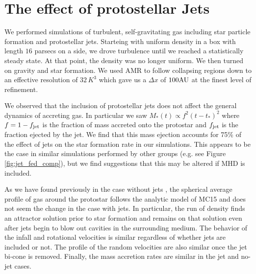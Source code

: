 \documentclass[../dissertation.tex]{subfiles}
\begin{document}

\section{The effect of protostellar Jets}
We performed simulations of turbulent, self-gravitating gas including star particle formation and protostellar jets. 
Starteing with uniform density in a box with length $16$ parsecs on a side, we drove turbulence until we reached a statistically steady state.
At that point, the density was no longer uniform.
We then turned on gravity and star formation.
We used AMR to follow collapsing regions down to an effective resolution of $32 \, K^3$ which gave us a $\Delta x$ of $100 {\rm AU}$ at the finest level of refinement.

We observed that the inclusion of protostellar jets does not affect the general dynamics of accreting gas.
In particular we saw $M_*(t) \propto f^2 (t-t_*)^2$ where $f = 1 - f_{\rm jet}$ is the fraction of mass accreted onto the protostar and $f_{\rm jet}$ is the fraction ejected by the jet.
We find that this mass ejection accounts for 75\% of the effect of jets on the star formation rate in our simulations.
This appears to be the case in similar simulations performed by other groups (e.g. see Figure \ref{fig:jet_fed_comp}), but we find suggestions that this may be altered if MHD is included.

As we have found previously in the case without jets \citep{2017MNRAS.465.1316M}, the spherical average profile of gas around the protostar follows the analytic model of MC15 and does not seem the change in the case with jets.  In particular, the run of density finds an attractor solution prior to star formation and remains on that solution even after jets begin to blow out cavities in the surrounding medium.
The behavior of the infall and rotational velocities is similar regardless of whether jets are included or not.
The profile of the random velocities are also similar once the jet bi-cone is removed.  Finally, the mass accretion rates are similar in the jet and no-jet cases.
\end{document}
